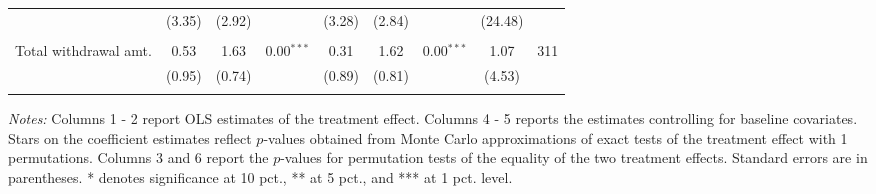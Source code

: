 \begin{table}[htbp]
{\begin{threeparttable}
\begin{tabular}{l*{8}{c}}
          &   (3.35)&   (2.92)&         &   (3.28)&   (2.84)&         &  (24.48)&         \\
          &         &         &         &         &         &         &         &         \\
Total withdrawal amt.&     0.53&     1.63&0.00$^{***}$&     0.31&     1.62&0.00$^{***}$&     1.07&      311\\
          &   (0.95)&   (0.74)&         &   (0.89)&   (0.81)&         &   (4.53)&         \\
          &         &         &         &         &         &         &         &         \\
\bottomrule \end{tabular} \begin{tablenotes}[flushleft] \footnotesize \item \emph{Notes:} Columns 1 - 2 report OLS estimates of the treatment effect. Columns 4 - 5 reports the estimates controlling for baseline covariates. Stars on the coefficient estimates reflect \(p\)-values obtained from Monte Carlo approximations of exact tests of the treatment effect with 1 permutations. Columns 3 and 6 report the \(p\)-values for permutation tests of the equality of the two treatment effects. Standard errors are in parentheses. * denotes significance at 10 pct., ** at 5 pct., and *** at 1 pct. level. \end{tablenotes} \end{threeparttable} } \end{table}

